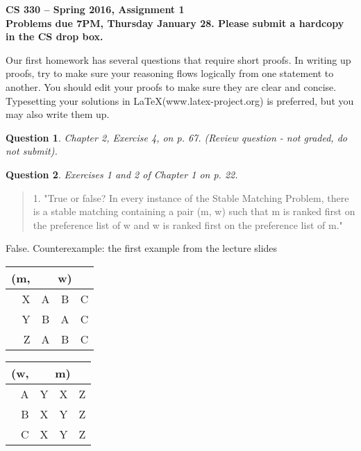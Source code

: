 \documentclass[11pt]{article}
\newtheorem{question}{Question}
\begin{document}
	
\begin{center}
\Large{\textbf{CS 330 -- Spring 2016, Assignment 1}}\\
\large{\textbf{Problems due 7PM, Thursday January 28.  Please submit a hardcopy in the CS drop box.}}
\end{center}


Our first homework has several questions that require short proofs.  In writing up proofs, try to make 
sure your reasoning flows logically from one statement to another.  You should edit your proofs to 
make sure they are clear and concise.  Typesetting your solutions in \LaTeX (www.latex-project.org) is
preferred, but you may also write them up. 


\setcounter{question}{-1}


\begin{question}
Chapter 2, Exercise 4, on p. 67.  (Review question - not graded, do not submit).
\end{question}



\begin{question}
Exercises 1 and 2 of Chapter 1 on p. 22.
\end{question}

\begin{quotation}

1.
"True or false? In every instance of the Stable Matching Problem, there is a stable matching containing a pair (m, w) such that m is ranked first on the preference list of w and w is ranked first on the preference list of m."

\end{quotation}

\begin{large}
False.
Counterexample: the first example from the lecture slides

\begin{table}[h]
\begin{center}
\begin{tabular}{r|ccc}
(m, & \multicolumn{3}{c}{w)}\\
\hline
X & A & B & C \\
Y & B & A & C \\
Z & A & B & C
\end{tabular}
\end{center}
\end{table}
\begin{table}[h]
\begin{center}
\begin{tabular}{r|ccc}
(w, & \multicolumn{3}{c}{m)}\\
\hline
A & Y & X & Z \\
B & X & Y & Z \\
C & X & Y & Z
\end{tabular}
\end{center}
\end{table}

\end{large}
\end{document}
